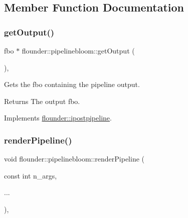 \subsection{Member Function Documentation}
\mbox{\label{classflounder_1_1pipelinebloom_a0ab1108f9115014014f7a8bd5ca5ac34}} 
\subsubsection{\texorpdfstring{get\+Output()}{getOutput()}}
{\footnotesize\ttfamily fbo $\ast$ flounder\+::pipelinebloom\+::get\+Output (\begin{DoxyParamCaption}{ }\end{DoxyParamCaption})\hspace{0.3cm}{\ttfamily [override]}, {\ttfamily [virtual]}}



Gets the fbo containing the pipeline output. 

\begin{DoxyReturn}{Returns}
The output fbo. 
\end{DoxyReturn}


Implements \hyperlink{classflounder_1_1ipostpipeline_a08f5d19b9652528337b73c2f4e0e4258}{flounder\+::ipostpipeline}.

\mbox{\label{classflounder_1_1pipelinebloom_a5f3e5c81ec41947b31f80027911addd0}} 
\subsubsection{\texorpdfstring{render\+Pipeline()}{renderPipeline()}}
{\footnotesize\ttfamily void flounder\+::pipelinebloom\+::render\+Pipeline (\begin{DoxyParamCaption}\item[{const int}]{n\+\_\+args,  }\item[{}]{... }\end{DoxyParamCaption})\hspace{0.3cm}{\ttfamily [override]}, {\ttfamily [virtual]}}



